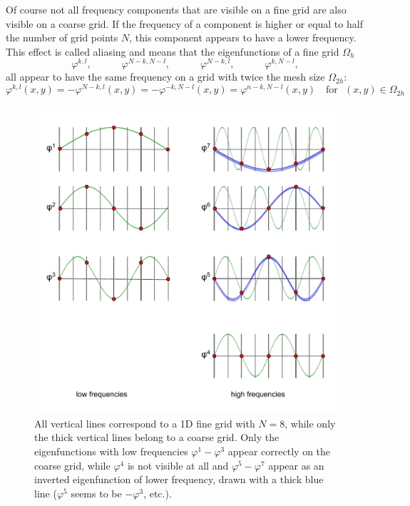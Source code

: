 Of course not all frequency components that are visible on a fine grid are also visible on a coarse grid. If the frequency of a component is higher or equal to half the number of grid points $N$, this component appears to have a lower frequency. 
This effect is called aliasing and means that the eigenfunctions of a fine grid $\Omega_h$
\begin{equation*}
\varphi^{k,l}, \text{~~~~~~~~~}\varphi^{N-k,N-l}, \text{~~~~~~~~~}\varphi^{N-k,l}, \text{~~~~~~~~~}\varphi^{k,N-l}, 
\end{equation*}
all appear to have the same frequency on a grid with twice the mesh size $\Omega_{2h}$:
\begin{equation}
\varphi^{k,l}(x,y) = - \varphi^{N-k,l}(x,y) = -\varphi^{-k,N-l}(x,y) = \varphi^{n-k,N-l}(x,y)  \text{~~~for~~}  (x,y) \in \Omega_{2h} 
\end{equation}


\begin{figure}[h]
	\centering
	\includegraphics[width=1.\textwidth]{chapters/chapter02/mg_low_aliasing}
	\caption{All vertical lines correspond to a 1D fine grid with $N = 8$, while only the thick vertical lines belong to a coarse grid. Only the eigenfunctions with low frequencies $\varphi^1 - \varphi^3$ appear correctly on the coarse grid, while $\varphi^4$ is not visible at all and $\varphi^5 - \varphi^7$ appear as an inverted eigenfunction of lower frequency, drawn with a thick blue line ($\varphi^5$ seems to be $-\varphi^3$, etc.).}
	\label{fig:mg_aliasing}
\end{figure}



